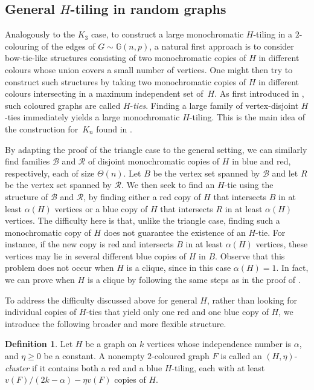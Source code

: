 \documentclass[a4paper,reqno,11pt]{amsart}
\theoremstyle{definition}
\newtheorem{definition}[theorem]{Definition}
\theoremstyle{remark}
\newcommand\cB{\mathcal{B}}
\newcommand\cR{\mathcal{R}}
\renewcommand\geq{\geqslant}
\begin{document}
\subsection{General $H$-tiling in random graphs}\label{subsec:2.2}
Analogously to the $K_3$ case, to construct a large monochromatic $H$-tiling in a $2$-colouring of the edges of $G \sim \mathbb{G}(n,p)$, a natural first approach is to consider bow-tie-like structures consisting of two monochromatic copies of $H$ in different colours whose union covers a small number of vertices. One might then try to construct such structures by taking two monochromatic copies of $H$ in different colours intersecting in a maximum independent set of~$H$. As first introduced in \cite{BES}, such coloured graphs are called $H$-\emph{ties}. Finding a large family of vertex-disjoint $H$-ties immediately yields a large monochromatic $H$-tiling. This is the main idea of the construction for~$K_n$ found in \cite{BES}.

By adapting the proof of the triangle case to the general setting, we can similarly find families $\cB$ and $\cR$ of disjoint monochromatic copies of $H$ in blue and red, respectively, each of size $\Theta(n)$. Let $B$ be the vertex set spanned by $\cB$ and let $R$ be the vertex set spanned by $\cR$. We then seek to find an $H$-tie using the structure of $\cB$ and $\cR$, by finding either a red copy of $H$ that intersects $B$ in at least $\alpha(H)$ vertices or a blue copy of $H$ that intersects $R$ in at least $\alpha(H)$ vertices. The difficulty here is that, unlike the triangle case, finding such a monochromatic copy of $H$ does not guarantee the existence of an $H$-tie. For instance, if the new copy is red and intersects $B$ in at least $\alpha(H)$ vertices, these vertices may lie in several different blue copies of $H$ in $B$. Observe that this problem does not occur when $H$ is a clique, since in this case $\alpha(H)=1$. In fact, we can prove  when $H$ is a clique by following the same steps as in the proof of .

To address the difficulty discussed above for general $H$, rather than looking for individual copies of $H$-ties that yield only one red and one blue copy of $H$, we introduce the following broader and more flexible structure.

\begin{definition}\label{def:clusters} Let $H$ be a graph on $k$ vertices whose independence number is $\alpha$, and $\eta\geq 0$ be a constant. A nonempty $2$-coloured graph $F$ is called an $(H,\eta)$-\emph{cluster} if it contains both a red and a blue $H$-tiling, each with at least $v(F)/(2k-\alpha)-\eta v(F)$ copies of $H$.
\end{definition}
\end{document}
